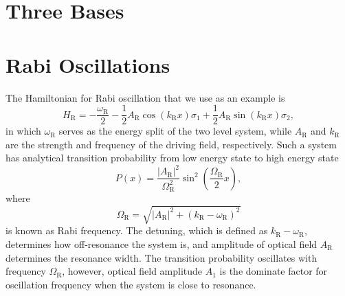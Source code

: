 \documentclass[%
reprint,
 amsmath,amssymb,
 aps,
]{revtex4-1}
\begin{document}
\appendix
\section{\label{sec:three-bases}Three Bases}


\section{\label{sec:rabi-oscillations}Rabi Oscillations}




The Hamiltonian for Rabi oscillation that we use as an example is
\begin{equation}
    H_{\mathrm R} = - \frac{\omega_{\mathrm R}}{2} - \frac{1}{2}A_{\mathrm{R}} \cos (k_{\mathrm{R}} x) \sigma_1 + \frac{1}{2} A_{\mathrm{R}} \sin (k_{\mathrm{R}} x) \sigma_2,\label{rabi-oscillation-single-perturbation}
\end{equation}
in which $\omega_{\mathrm R}$ serves as the energy split of the two level system, while $A_{\mathrm{R}}$ and $k_{\mathrm{R}}$ are the strength and frequency of the driving field, respectively. Such a system has analytical transition probability from low energy state to high energy state
\begin{equation}
    P(x) = \frac{\left \lvert A_{\mathrm{R}} \right \rvert ^2}{ \Omega_{\mathrm R}^2 } \sin^2 \left( \frac{\Omega_{\mathrm R}}{2} x \right),
    \label{rabi-system-hamiltonian}
\end{equation}
where
\begin{equation}
\Omega_{\mathrm R} = \sqrt{ \lvert A_{\mathrm{R}}\rvert^2 + (k_{\mathrm{R}} - \omega_{\mathrm R})^2 }
\end{equation} is known as Rabi frequency. The detuning, which is defined as $k_{\mathrm{R}} - \omega_{\mathrm R}$, determines how off-resonance the system is, and amplitude of optical field $A_{\mathrm{R}}$ determines the resonance width. The transition probability oscillates with frequency $\Omega_{\mathrm R}$, however, optical field amplitude $A_1$ is the dominate factor for oscillation frequency when the system is close to resonance.






 



\end{document}
